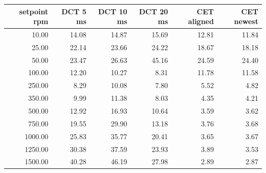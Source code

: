 \begin{tabular}{@{}rrrrrr@{}}
\toprule
setpoint rpm & DCT 5 ms & DCT 10 ms & DCT 20 ms & CET aligned & CET newest \\
\midrule
10.00 & 14.08 & 14.87 & 15.69 & 12.81 & 11.84 \\
25.00 & 22.14 & 23.66 & 24.22 & 18.67 & 18.18 \\
50.00 & 23.47 & 26.63 & 45.16 & 24.59 & 24.40 \\
100.00 & 12.20 & 10.27 & 8.31 & 11.78 & 11.58 \\
250.00 & 8.29 & 10.08 & 7.80 & 5.52 & 4.82 \\
350.00 & 9.99 & 11.38 & 8.03 & 4.35 & 4.21 \\
500.00 & 12.92 & 16.93 & 10.64 & 3.59 & 3.62 \\
750.00 & 19.55 & 29.90 & 13.18 & 3.76 & 3.68 \\
1000.00 & 25.83 & 35.77 & 20.41 & 3.65 & 3.67 \\
1250.00 & 30.38 & 37.59 & 23.93 & 3.89 & 3.53 \\
1500.00 & 40.28 & 46.19 & 27.98 & 2.89 & 2.87 \\
\bottomrule
\end{tabular}
